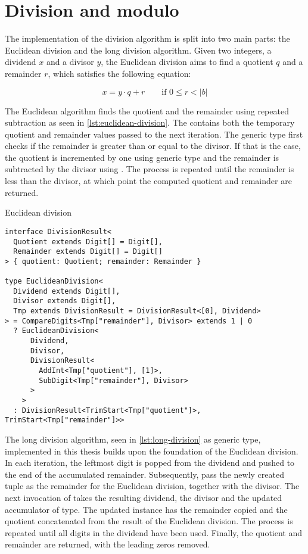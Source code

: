 \section{Division and modulo}

The implementation of the division algorithm is split into two main parts: the Euclidean division and the long division algorithm. Given two integers, a dividend $x$ and a divisor $y$, the Euclidean division aims to find a quotient $q$ and a remainder $r$, which satisfies the following equation:

$$x = y\cdot q + r \qquad \text{if } 0 \le r < |b|$$

The Euclidean algorithm finds the quotient and the remainder using repeated subtraction as seen in \ref{lst:euclidean-division}. The  contains both the temporary quotient and remainder values passed to the next iteration. The  generic type first checks if the remainder is greater than or equal to the divisor. If that is the case, the quotient is incremented by one using  generic type and the remainder is subtracted by the divisor using . The process is repeated until the remainder is less than the divisor, at which point the computed quotient and remainder are returned.

\begin{listing}[ht]
\caption{Euclidean division}\label{lst:euclidean-division}
\begin{verbatim}
interface DivisionResult<
  Quotient extends Digit[] = Digit[],
  Remainder extends Digit[] = Digit[]
> { quotient: Quotient; remainder: Remainder }

type EuclideanDivision<
  Dividend extends Digit[],
  Divisor extends Digit[],
  Tmp extends DivisionResult = DivisionResult<[0], Dividend>
> = CompareDigits<Tmp["remainder"], Divisor> extends 1 | 0
  ? EuclideanDivision<
      Dividend,
      Divisor,
      DivisionResult<
        AddInt<Tmp["quotient"], [1]>,
        SubDigit<Tmp["remainder"], Divisor>
      >
    >
  : DivisionResult<TrimStart<Tmp["quotient"]>, TrimStart<Tmp["remainder"]>>
\end{verbatim}
\end{listing}

The long division algorithm, seen in \ref{lst:long-division} as  generic type, implemented in this thesis builds upon the foundation of the Euclidean division. In each iteration, the leftmost digit is popped from the dividend and pushed to the end of the accumulated remainder. Subsequently, pass the newly created tuple as the remainder for the Euclidean division, together with the divisor. The next invocation of  takes the resulting dividend, the divisor and the updated accumulator of  type. The updated  instance has the remainder copied and the quotient concatenated from the result of the Euclidean division. The process is repeated until all digits in the dividend have been used. Finally, the quotient and remainder are returned, with the leading zeros removed.

